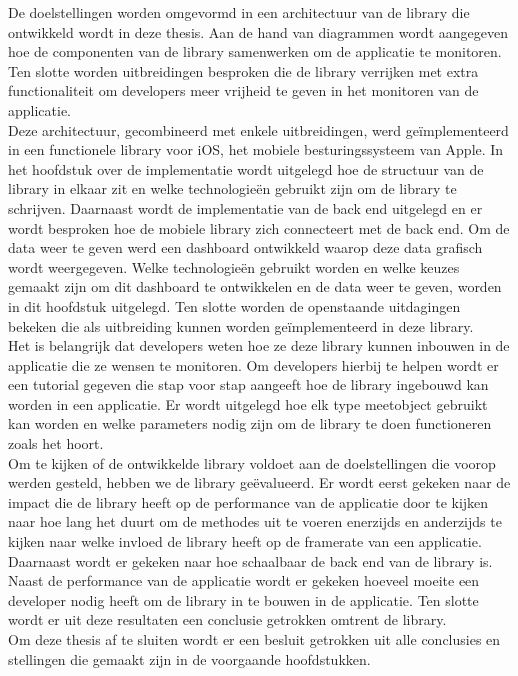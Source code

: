 De doelstellingen worden omgevormd in een architectuur van de library die ontwikkeld wordt in deze thesis. Aan de hand van diagrammen wordt aangegeven hoe de componenten van de library samenwerken om de applicatie te monitoren. Ten slotte worden uitbreidingen besproken die de library verrijken met extra functionaliteit om developers meer vrijheid te geven in het monitoren van de applicatie. \\

Deze architectuur, gecombineerd met enkele uitbreidingen, werd ge\"implementeerd in een functionele library voor iOS, het mobiele besturingssysteem van Apple. In het hoofdstuk over de implementatie wordt uitgelegd hoe de structuur van de library in elkaar zit en welke technologie\"en gebruikt zijn om de library te schrijven. Daarnaast wordt de implementatie van de back end uitgelegd en er wordt besproken hoe de mobiele library zich connecteert met de back end. Om de data weer te geven werd een dashboard ontwikkeld waarop deze data grafisch wordt weergegeven. Welke technologie\"en gebruikt worden en welke keuzes gemaakt zijn om dit dashboard te ontwikkelen en de data weer te geven, worden in dit hoofdstuk uitgelegd. Ten slotte worden de openstaande uitdagingen bekeken die als uitbreiding kunnen worden ge\"implementeerd in deze library.\\


Het is belangrijk dat developers weten hoe ze deze library kunnen inbouwen in de applicatie die ze wensen te monitoren. Om developers hierbij te helpen wordt er een tutorial gegeven die stap voor stap aangeeft hoe de library ingebouwd kan worden in een applicatie. Er wordt uitgelegd hoe elk type meetobject gebruikt kan worden en welke parameters nodig zijn om de library te doen functioneren zoals het hoort. \\

Om te kijken of de ontwikkelde library voldoet aan de doelstellingen die voorop werden gesteld, hebben we de library ge\"evalueerd. Er wordt eerst gekeken naar de impact die de library heeft op de performance van de applicatie door te kijken naar hoe lang het duurt om de methodes uit te voeren enerzijds en anderzijds te kijken naar welke invloed de library heeft op de framerate van een applicatie. Daarnaast wordt er gekeken naar hoe schaalbaar de back end van de library is. Naast de performance van de applicatie wordt er gekeken hoeveel moeite een developer nodig heeft om de library in te bouwen in de applicatie. Ten slotte wordt er uit deze resultaten een conclusie getrokken omtrent de library. \\

Om deze thesis af te sluiten wordt er een besluit getrokken uit alle conclusies en stellingen die gemaakt zijn in de voorgaande hoofdstukken. \\


